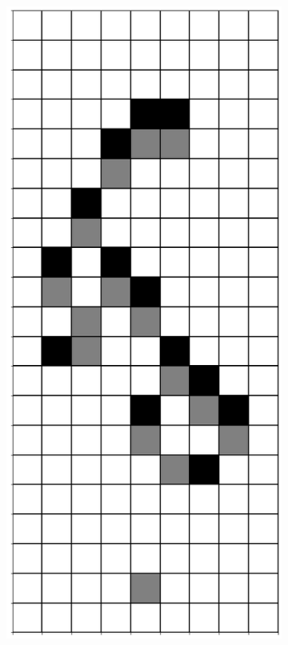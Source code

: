 \documentclass[12pt]{article}
\numberwithin{figure}{section} %
\begin{document}
\begin{figure}[H]
\begin{subfigure}{0.19\textwidth}
     \subcaption{}
   \end{subfigure}
        \begin{subfigure}{0.19\textwidth}
     \centering
     \includegraphics[width=\linewidth]{Section4/25.2}

\end{subfigure}
\end{figure}
\end{document}
